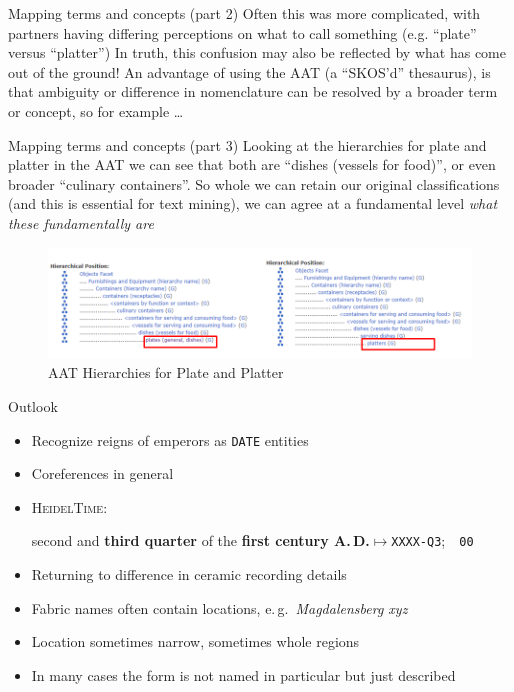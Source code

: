\documentclass[xcolor=x11names, aspectratio=169,usenames,dvipsnames]{beamer}
\begin{document}
\begin{frame}{Mapping terms and concepts (part 2)}
Often this was more complicated, with partners having differing perceptions on what to call something (e.g. \enquote{plate} versus \enquote{platter})\newline
\newline
In truth, this confusion may also be reflected by what has come out of the ground!\newline
\newline
An advantage of using the AAT (a \enquote{SKOS'd} thesaurus), is that ambiguity or difference in nomenclature can be resolved by  a broader term or concept, so for example \dots
\end{frame}

\begin{frame}{Mapping terms and concepts (part 3)}
Looking at the hierarchies for plate and platter in the AAT we can see that both are \enquote{dishes (vessels for food)}, or even broader \enquote{culinary containers}. So whole we can retain our original classifications (and this is essential for text mining), we can agree at a fundamental level \emph{what these fundamentally are}
\begin{center}
\begin{figure}
\includegraphics[width=\textwidth]{img/tim_hierarchy_plate.png}
\caption{AAT Hierarchies for Plate and Platter}
\end{figure}
\end{center}
\end{frame}

\begin{frame}{Outlook}
\begin{itemize}
\item Recognize reigns of emperors as \texttt{DATE} entities
\item Coreferences in general
\item \textsc{HeidelTime}:

second and \textbf{third quarter} of the \textbf{first century A.\,D.}\quad$\longmapsto$\quad\texttt{XXXX-Q3};~~\texttt{00}
\item Returning to difference in ceramic recording details
\item Fabric names often contain locations, e.\,g.\ \emph{Magdalensberg xyz}
\item Location sometimes narrow, sometimes whole regions
\item In many cases the form is not named in particular but just described
\end{itemize}
\end{frame}
\end{document}

